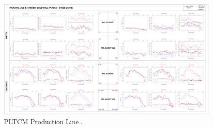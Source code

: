 \begin{landscape}
\begin{figure}[ht]
	\centering
	\hspace*{-1.3cm}
	\captionsetup{width=1.1\linewidth}
	\includegraphics[width=1.6\textwidth]{../images/supplements-PLTCM_real_life_events_analysis-results-curves_and_time_resolutions.png}
	\caption{PLTCM Production Line \cc{} \dd{}.}
	\label{figure-supplements-PLTCM-curveplots_sliding}
\end{figure}
\end{landscape}